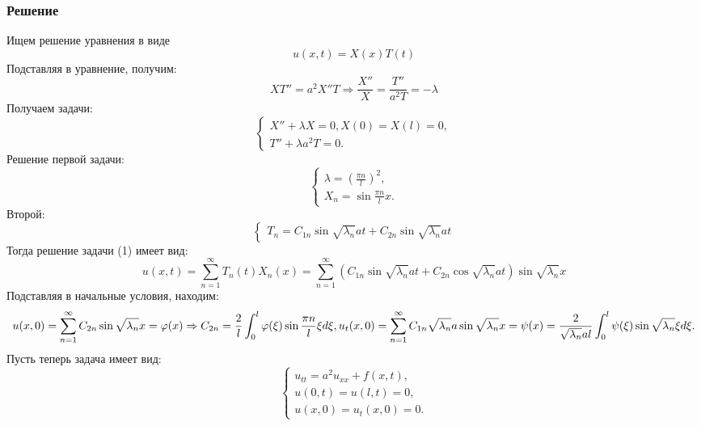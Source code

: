 \documentclass[11pt]{article}
\begin{document}
\subsubsection{Решение}
\label{sec:org3e004f3}
Ищем решение уравнения в виде
\begin{equation}
u(x, t) = X(x)T(t)
\end{equation}
Подставляя в уравнение, получим:
\begin{equation}
XT'' = a^2X''T \Rightarrow \frac{X''}X = \frac{T''}{a^2T} = -\lambda
\end{equation}
Получаем задачи:
\begin{equation}
\begin{cases}
X'' + \lambda X = 0, X(0) = X(l) = 0, \\
T'' + \lambda a^2T = 0.
\end{cases}
\end{equation}
Решение первой задачи:
\begin{equation}
\begin{cases}
\lambda = \left(\frac{\pi n}l\right)^2, \\
X_n = \sin\frac{\pi n}lx.
\end{cases}
\end{equation}
Второй:
\begin{equation}
\begin{cases}
T_n = C_{1n}\sin\sqrt{\lambda_n}at + C_{2n}\sin\sqrt{\lambda_n}at
\end{cases}
\end{equation}
Тогда решение задачи (1) имеет вид:
\begin{equation}
u(x, t) = \sum_{n = 1}^{\infty}T_n(t)X_n(x) = \sum_{n = 1}^{\infty}(C_{1n}\sin\sqrt{\lambda_n}at +
C_{2n}\cos\sqrt{\lambda_n}at)\sin\sqrt{\lambda_n}x
\end{equation}
Подставляя в начальные условия, находим:
\begin{equation}
u(x, 0) = \sum_{n = 1}^{\infty}C_{2n}\sin\sqrt{\lambda_n}x = \varphi(x) \Rightarrow C_{2n} =
\frac2l\int_0^l\varphi(\xi)\sin\frac{\pi n}l\xi d\xi, \\
u_t(x, 0) = \sum_{n = 1}^{\infty}C_{1n}\sqrt{\lambda_n}a\sin\sqrt{\lambda_n}x = \psi(x) =
\frac2{\sqrt{\lambda_n}al}\int_0^l\psi(\xi)\sin\sqrt{\lambda_n}\xi d\xi.
\end{equation}
Пусть теперь задача имеет вид:
\begin{equation}
\begin{cases}
u_{tt} = a^2u_{xx} + f(x, t), \\
u(0, t) = u(l, t) = 0, \\
u(x, 0) = u_t(x, 0) = 0.
\end{cases}
\end{equation}
\end{document}

